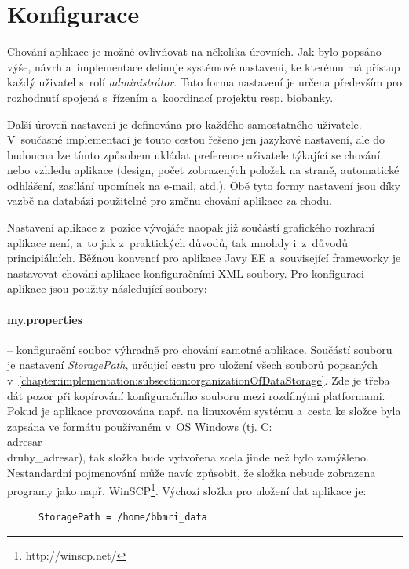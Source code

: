 \documentclass[11pt, final, oneside]{fithesis2}
\begin{document}
\section{Konfigurace}\label{chapter:implementation:section:configuration}
Chování aplikace je možné ovlivňovat na několika úrovních. Jak bylo popsáno výše, návrh a~implementace definuje systémové nastavení, ke kterému má přístup každý uživatel s~rolí \textit{administrátor}. Tato forma nastavení je určena především pro rozhodnutí spojená s~řízením a~koordinací projektu resp. biobanky. 

Další úroveň nastavení je definována pro každého samostatného uživatele. V~současné implementaci je touto cestou řešeno jen jazykové nastavení, ale do budoucna lze tímto způsobem ukládat preference uživatele týkající se chování nebo vzhledu aplikace (design, počet zobrazených položek na straně, automatické odhlášení, zasílání upomínek na e-mail, atd.).
Obě tyto formy nastavení jsou díky vazbě na databázi použitelné pro změnu chování aplikace za chodu. 

Nastavení aplikace z~pozice vývojáře naopak již součástí grafického rozhraní aplikace není, a~to jak z~praktických důvodů, tak mnohdy i~z~důvodů principiálních. Běžnou konvencí pro aplikace Javy EE a~související frameworky je nastavovat chování aplikace konfiguračními XML soubory. Pro konfiguraci aplikace jsou použity následující soubory:

\paragraph*{my.properties} -- konfigurační soubor výhradně pro chování samotné aplikace. Součástí souboru je nastavení \textit{StoragePath}, určující cestu pro uložení všech souborů popsaných v~\ref{chapter:implementation:subsection:organizationOfDataStorage}. Zde je třeba dát pozor při kopírování konfiguračního souboru mezi rozdílnými platformami. Pokud je aplikace provozována např. na linuxovém systému a~cesta ke složce byla zapsána ve formátu používaném v~OS Windows (tj. C:\\adresar\\druhy\_adresar), tak složka bude vytvořena zcela jinde než bylo zamýšleno. Nestandardní pojmenování může navíc způsobit, že složka nebude zobrazena programy jako např. WinSCP\footnote{http://winscp.net/}. Výchozí složka pro uložení dat aplikace je:

\begin{figure}[h!]
\centering
\begin{BVerbatim}
StoragePath = /home/bbmri_data
\end{BVerbatim}
\end{figure}
\end{document}
